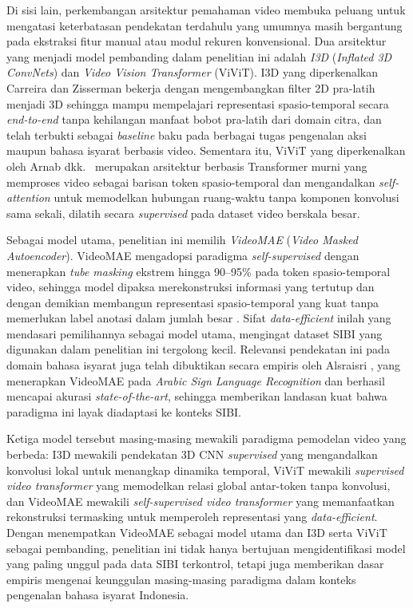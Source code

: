 Di sisi lain, perkembangan arsitektur pemahaman video membuka peluang untuk mengatasi keterbatasan pendekatan terdahulu yang umumnya masih bergantung pada ekstraksi fitur manual atau modul rekuren konvensional. Dua arsitektur yang menjadi model pembanding dalam penelitian ini adalah \textit{I3D} (\textit{Inflated 3D ConvNets}) dan \textit{Video Vision Transformer} (ViViT). I3D yang diperkenalkan Carreira dan Zisserman \cite{Carreira2017I3D} bekerja dengan mengembangkan filter 2D pra-latih menjadi 3D sehingga mampu mempelajari representasi spasio-temporal secara \textit{end-to-end} tanpa kehilangan manfaat bobot pra-latih dari domain citra, dan telah terbukti sebagai \textit{baseline} baku pada berbagai tugas pengenalan aksi maupun bahasa isyarat berbasis video. Sementara itu, ViViT yang diperkenalkan oleh Arnab dkk.\ \cite{Arnab2021} merupakan arsitektur berbasis Transformer murni yang memproses video sebagai barisan token spasio-temporal dan mengandalkan \textit{self-attention} untuk memodelkan hubungan ruang-waktu tanpa komponen konvolusi sama sekali, dilatih secara \textit{supervised} pada dataset video berskala besar.\par

Sebagai model utama, penelitian ini memilih \textit{VideoMAE} (\textit{Video Masked Autoencoder}). VideoMAE mengadopsi paradigma \textit{self-supervised} dengan menerapkan \textit{tube masking} ekstrem hingga 90--95\% pada token spasio-temporal video, sehingga model dipaksa merekonstruksi informasi yang tertutup dan dengan demikian membangun representasi spasio-temporal yang kuat tanpa memerlukan label anotasi dalam jumlah besar \cite{Tong2022VideoMAE}. Sifat \textit{data-efficient} inilah yang mendasari pemilihannya sebagai model utama, mengingat dataset SIBI yang digunakan dalam penelitian ini tergolong kecil. Relevansi pendekatan ini pada domain bahasa isyarat juga telah dibuktikan secara empiris oleh Alsraisri \cite{Alsraisri2025}, yang menerapkan VideoMAE pada \textit{Arabic Sign Language Recognition} dan berhasil mencapai akurasi \textit{state-of-the-art}, sehingga memberikan landasan kuat bahwa paradigma ini layak diadaptasi ke konteks SIBI.\par

Ketiga model tersebut masing-masing mewakili paradigma pemodelan video yang berbeda: I3D mewakili pendekatan 3D CNN \textit{supervised} yang mengandalkan konvolusi lokal untuk menangkap dinamika temporal, ViViT mewakili \textit{supervised video transformer} yang memodelkan relasi global antar-token tanpa konvolusi, dan VideoMAE mewakili \textit{self-supervised video transformer} yang memanfaatkan rekonstruksi termasking untuk memperoleh representasi yang \textit{data-efficient}. Dengan menempatkan VideoMAE sebagai model utama dan I3D serta ViViT sebagai pembanding, penelitian ini tidak hanya bertujuan mengidentifikasi model yang paling unggul pada data SIBI terkontrol, tetapi juga memberikan dasar empiris mengenai keunggulan masing-masing paradigma dalam konteks pengenalan bahasa isyarat Indonesia.\par

